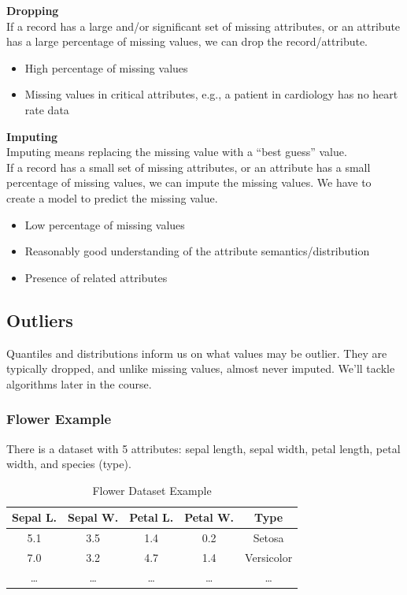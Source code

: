 \begin{paracol}{2}
\textbf{Dropping}\\
If a record has a large and/or significant set of missing attributes, or an attribute has a
large percentage of missing values, we can drop the record/attribute.
\begin{itemize}
	\item High percentage of missing
values
	\item Missing values in critical
attributes, e.g., a patient in
cardiology has no heart rate data
\end{itemize}

\switchcolumn

\textbf{Imputing}\\
Imputing means replacing the missing value with a
``best guess'' value.\\
If a record has a small set of missing attributes, or an attribute has a small percentage of
missing values, we can impute the missing values.
We have to create a model to predict the missing value.

\begin{itemize}
	\item Low percentage of missing values
	\item Reasonably good understanding of the attribute semantics/distribution
	\item Presence of related attributes
\end{itemize}
\end{paracol}

\subsection{Outliers}

Quantiles and distributions inform us on what values may be outlier. 
They are typically dropped, and unlike missing values, almost never imputed.
We'll tackle algorithms later in the course.

\subsubsection{Flower Example}

There is a dataset with 5 attributes: sepal length, sepal width, petal length, petal width, and species (type).

\begin{table}[h!]
\centering
\begin{tabular}{ccccc}
\toprule
\textbf{Sepal L.} & \textbf{Sepal W.} & \textbf{Petal L.} & \textbf{Petal W.} & \textbf{Type} \\
\midrule
5.1 & 3.5 & 1.4 & 0.2 & Setosa \\
7.0 & 3.2 & 4.7 & 1.4 & Versicolor \\
\ldots & \ldots & \ldots & \ldots & \ldots \\
\bottomrule
\end{tabular}
\caption{Flower Dataset Example}
\end{table}

